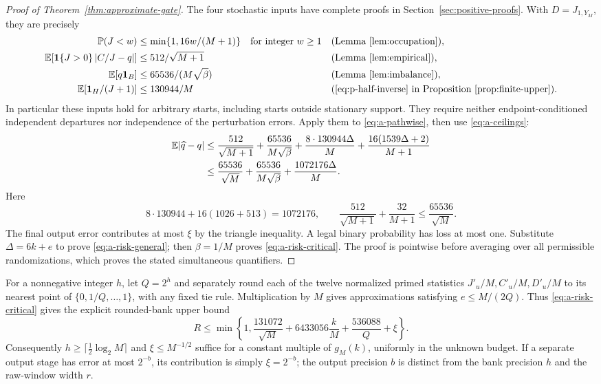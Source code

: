 \begin{proof}[Proof of Theorem~\ref{thm:approximate-gate}]
The four stochastic inputs have complete proofs in
Section~\ref{sec:positive-proofs}.  With $D=J_{1,Y_M}$, they are precisely
\begin{align*}
 \mathbb P(J<w)&\le\min\{1,16w/(M+1)\}
          &&\text{for integer }w\ge1
          &&\text{(Lemma~\ref{lem:occupation})},\\
 \mathbb E\!\left[\mathbf 1\{J>0\}\left|C/J-q\right|\right]
      &\le512/\sqrt{M+1}
          &&&&\text{(Lemma~\ref{lem:empirical})},\\
 \mathbb E[q\mathbf 1_B]&\le65536/(M\sqrt\beta)
          &&&&\text{(Lemma~\ref{lem:imbalance})},\\
 \mathbb E[\mathbf 1_H/(J+1)]&\le130944/M
          &&&&\text{(\eqref{eq:p-half-inverse} in
                    Proposition~\ref{prop:finite-upper})}.
\end{align*}
In particular these inputs hold for arbitrary starts, including starts
outside stationary support.  They require neither endpoint-conditioned
independent departures nor independence of the perturbation errors.
Apply them to \eqref{eq:a-pathwise}, then use \eqref{eq:a-ceilings}:
\[
 \begin{split}
 \mathbb E|\widehat q-q|\le{}&
 \frac{512}{\sqrt{M+1}}+\frac{65536}{M\sqrt\beta}
 +\frac{8\cdot130944\Delta}{M}
 +\frac{16(1539\Delta+2)}{M+1}\\
 \le{}&\frac{65536}{\sqrt M}+\frac{65536}{M\sqrt\beta}
       +\frac{1072176\Delta}{M}.
 \end{split}
\]
Here
\[
 8\cdot130944+16(1026+513)=1072176,\qquad
 \frac{512}{\sqrt{M+1}}+\frac{32}{M+1}
 \le\frac{65536}{\sqrt M}.
\]
The final output error contributes at most $\xi$ by the triangle
inequality.  A legal binary probability has loss at most one.
Substitute $\Delta=6k+e$ to prove \eqref{eq:a-risk-general};
then $\beta=1/M$ proves \eqref{eq:a-risk-critical}.
The proof is pointwise before averaging over all permissible
randomizations, which proves the stated simultaneous quantifiers.
\end{proof}

For a nonnegative integer $h$, let $Q=2^h$ and separately round each
of the twelve normalized primed statistics
$J'_u/M,C'_u/M,D'_u/M$ to its nearest point of
$\{0,1/Q,\ldots,1\}$, with any fixed tie rule.  Multiplication by $M$
gives approximations satisfying $e\le M/(2Q)$.  Thus
\eqref{eq:a-risk-critical} gives the explicit rounded-bank upper bound
\begin{equation}\label{eq:a-rounded-risk}
 R\le\min\left\{1,
 \frac{131072}{\sqrt M}+6433056\frac kM+\frac{536088}{Q}+\xi
 \right\}.
\end{equation}
Consequently $h\ge\lceil\tfrac12\log_2 M\rceil$ and
$\xi\le M^{-1/2}$ suffice for a constant multiple of $g_M(k)$,
uniformly in the unknown budget.  If a separate output stage has error
at most $2^{-b}$, its contribution is simply $\xi=2^{-b}$; the output
precision $b$ is distinct from the bank precision $h$ and the raw-window
width $r$.


